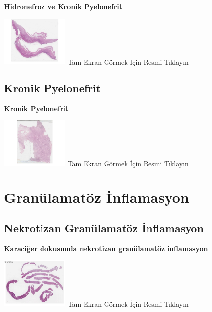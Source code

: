 \documentclass[
  letterpaper,
  DIV=11,
  numbers=noendperiod]{scrreprt}
\begin{document}
\textbf{Hidronefroz ve Kronik Pyelonefrit}

\href{https://images.patolojiatlasi.com/chronicpyelonephritis/HE2.html}{\includegraphics[width=0.25\textwidth,height=\textheight]{./screenshots/thumbnail_chronicpyelonephritis-2.png}}
\href{https://images.patolojiatlasi.com/chronicpyelonephritis/HE2.html}{Tam
Ekran Görmek İçin Resmi Tıklayın}

\hypertarget{sec-kronik-pyelonefrit}{%
\section{Kronik Pyelonefrit}\label{sec-kronik-pyelonefrit}}

\textbf{Kronik Pyelonefrit}

\href{https://images.patolojiatlasi.com/chronic-pyelonephritis/HE.html}{\includegraphics[width=0.25\textwidth,height=\textheight]{./screenshots/thumbnail_chronic-pyelonephritis.png}}
\href{https://images.patolojiatlasi.com/chronic-pyelonephritis/HE.html}{Tam
Ekran Görmek İçin Resmi Tıklayın}

\hypertarget{sec-granulamatoz-inflamasyon}{%
\chapter{Granülamatöz İnflamasyon}\label{sec-granulamatoz-inflamasyon}}

\hypertarget{sec-nekrotizan-granulamatoz-inflamasyon}{%
\section{Nekrotizan Granülamatöz
İnflamasyon}\label{sec-nekrotizan-granulamatoz-inflamasyon}}

\textbf{Karaciğer dokusunda nekrotizan granülamatöz inflamasyon}

\href{https://images.patolojiatlasi.com/necrotisinggranuloma/HE.html}{\includegraphics[width=0.25\textwidth,height=\textheight]{./screenshots/thumbnail_necrotisinggranuloma.png}}
\href{https://images.patolojiatlasi.com/necrotisinggranuloma/HE.html}{Tam
Ekran Görmek İçin Resmi Tıklayın}
\end{document}
